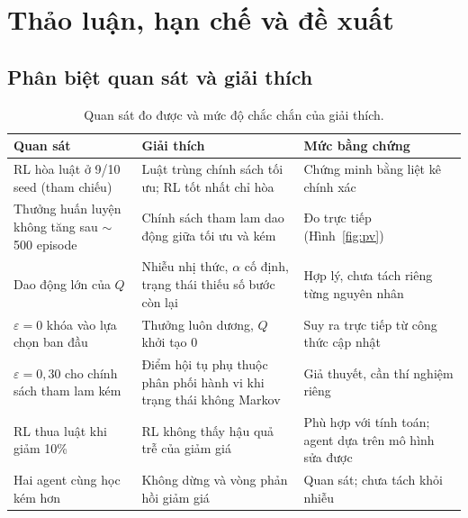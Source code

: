 \documentclass[12pt,a4paper]{report}
\begin{document}
\section{Thảo luận, hạn chế và đề xuất}
\label{chap:discussion}

\subsection{Phân biệt quan sát và giải thích}
\begin{table}[H]
\centering
\small
\caption{Quan sát đo được và mức độ chắc chắn của giải thích.}
\begin{tabularx}{\textwidth}{XX>{\raggedright\arraybackslash}p{4.3cm}}
\toprule
Quan sát & Giải thích & Mức bằng chứng \\
\midrule
RL hòa luật ở 9/10 seed (tham chiếu) & Luật trùng chính sách tối ưu; RL tốt nhất chỉ hòa & Chứng minh bằng liệt kê chính xác \\
Thưởng huấn luyện không tăng sau $\sim$500 episode & Chính sách tham lam dao động giữa tối ưu và kém & Đo trực tiếp (Hình~\ref{fig:pv}) \\
Dao động lớn của $Q$ & Nhiễu nhị thức, $\alpha$ cố định, trạng thái thiếu số bước còn lại & Hợp lý, chưa tách riêng từng nguyên nhân \\
$\varepsilon=0$ khóa vào lựa chọn ban đầu & Thưởng luôn dương, $Q$ khởi tạo 0 & Suy ra trực tiếp từ công thức cập nhật \\
$\varepsilon=0{,}30$ cho chính sách tham lam kém & Điểm hội tụ phụ thuộc phân phối hành vi khi trạng thái không Markov & Giả thuyết, cần thí nghiệm riêng \\
RL thua luật khi giảm 10\% & RL không thấy hậu quả trễ của giảm giá & Phù hợp với tính toán; agent dựa trên mô hình sửa được \\
Hai agent cùng học kém hơn & Không dừng và vòng phản hồi giảm giá & Quan sát; chưa tách khỏi nhiễu \\
\bottomrule
\end{tabularx}
\end{table}
\end{document}
